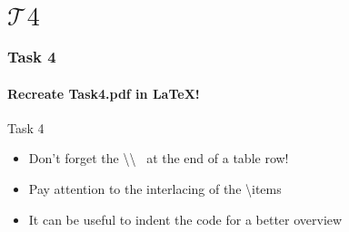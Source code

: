 \section{$\mathcal{T}4$} 
\begin{frame}
\frametitle{Task 4}
\framesubtitle{Recreate Task4.pdf in \LaTeX !} 

\begin{block}{Task 4}
\begin{itemize}
  \item Don't forget the \color{nounibaredII}\textbackslash \textbackslash  \color{black}~ at the end of a table row!%
  \item Pay attention to the interlacing of the \color{nounibaredII}\textbackslash item\color{black}s%
  \item It can be useful to indent the code for a better overview%
\end{itemize}
\end{block}
\end{frame}
